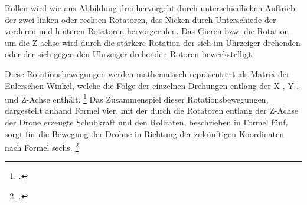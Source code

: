 Rollen wird wie aus Abbildung drei hervorgeht durch unterschiedlichen Auftrieb der zwei linken oder rechten Rotatoren, das Nicken durch Unterschiede der vorderen und hinteren Rotatoren hervorgerufen.
Das Gieren bzw. die Rotation um die Z-achse wird durch die stärkere Rotation der sich im Uhrzeiger drehenden oder der sich gegen den Uhrzeiger drehenden Rotoren bewerkstelligt. 

Diese Rotationsbewegungen werden mathematisch repräsentiert als Matrix der Eulerschen Winkel, welche die Folge der einzelnen Drehungen entlang der X-, Y-, und Z-Achse enthält. \footcite[Vgl.][S. 3]{Deshpande.2020}
Das Zusammenspiel dieser Rotationsbewegungen, dargestellt anhand Formel vier, mit der durch die Rotatoren entlang der Z-Achse der Drone erzeugte Schubkraft und den Rollraten, beschrieben in Formel fünf, sorgt für die Bewegung der Drohne in Richtung der zukünftigen Koordinaten nach Formel sechs. \footcite[Vgl.][S. 2]{Deshpande.2021}

